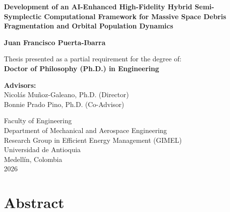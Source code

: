 \documentclass[12pt,letterpaper,twoside]{book}
\begin{document}
\frontmatter

\begin{titlepage}
\begin{center}
    \vspace*{0.5cm}
    {\LARGE \bfseries Development of an AI-Enhanced High-Fidelity Hybrid Semi-Symplectic Computational Framework for Massive Space Debris Fragmentation and Orbital Population Dynamics \par}
    
    \vspace{1.8cm}
    {\Large \textbf{Juan Francisco Puerta-Ibarra} \par}
    
    \vspace{2.0cm}
    {\normalsize Thesis presented as a partial requirement for the degree of: \\
    \textbf{Doctor of Philosophy (Ph.D.) in Engineering} \par}
    
    \vspace{2.0cm}
    {\normalsize
    \textbf{Advisors:} \\
    Nicolás Muñoz-Galeano, Ph.D. (Director) \\
    Bonnie Prado Pino, Ph.D. (Co-Advisor) \par}
    
    \vfill
    {\normalsize
    Faculty of Engineering \\
    Department of Mechanical and Aerospace Engineering \\
    Research Group in Efficient Energy Management (GIMEL) \\
    Universidad de Antioquia \\
    Medellín, Colombia \\
    2026 \par}
\end{center}
\end{titlepage}

\cleardoublepage

\chapter*{Abstract}
\end{document}
